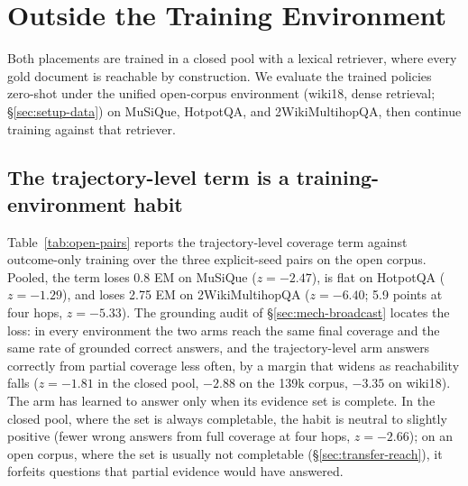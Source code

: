 
\section{Outside the Training Environment}
\label{sec:transfer}

Both placements are trained in a closed pool with a lexical retriever,
where every gold document is reachable by construction. We evaluate
the trained policies zero-shot under the unified open-corpus
environment (wiki18, dense retrieval; \S\ref{sec:setup-data}) on
MuSiQue, HotpotQA, and 2WikiMultihopQA, then continue training against
that retriever.

\subsection{The trajectory-level term is a training-environment habit}
\label{sec:transfer-traj}

Table~\ref{tab:open-pairs} reports the trajectory-level coverage term
against outcome-only training over the three explicit-seed pairs on
the open corpus. Pooled, the term loses 0.8 EM on MuSiQue ($z=-2.47$),
is flat on HotpotQA ($z=-1.29$), and loses 2.75 EM on 2WikiMultihopQA
($z=-6.40$; 5.9 points at four hops, $z=-5.33$). The grounding audit
of \S\ref{sec:mech-broadcast} locates the loss: in every environment
the two arms reach the same final coverage and the same rate of
grounded correct answers, and the trajectory-level arm answers
correctly from partial coverage less often, by a margin that widens as
reachability falls ($z=-1.81$ in the closed pool, $-2.88$ on the 139k
corpus, $-3.35$ on wiki18). The arm has learned to answer only when
its evidence set is complete. In the closed pool, where the set is
always completable, the habit is neutral to slightly positive (fewer
wrong answers from full coverage at four hops, $z=-2.66$); on an open
corpus, where the set is usually not completable
(\S\ref{sec:transfer-reach}), it forfeits questions that partial
evidence would have answered.

